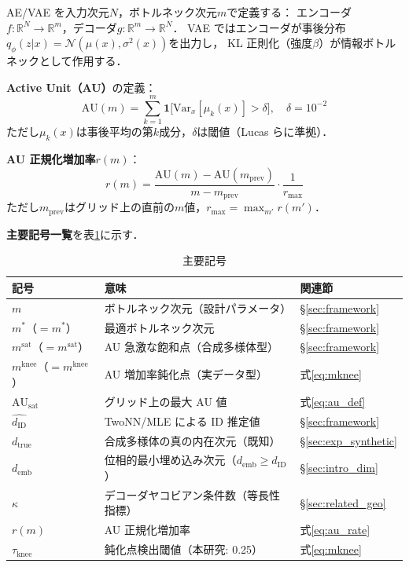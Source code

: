 \documentclass[11pt,a4paper]{jsarticle}
\newcommand{\dID}{d_{\mathrm{ID}}}
\newcommand{\dzopt}{m^*}
\newcommand{\dtrue}{d_{\mathrm{true}}}
\newcommand{\R}{\mathbb{R}}
\newcommand{\kap}{\kappa}
\newcommand{\AUsat}{\mathrm{AU}_{\mathrm{sat}}}
\newcommand{\dzsat}{m^{\mathrm{sat}}}
\newcommand{\mknee}{m^{\mathrm{knee}}}
\newcommand{\demb}{d_{\mathrm{emb}}}
\begin{document}
AE/VAE を入力次元$N$，ボトルネック次元$m$で定義する：
エンコーダ$f: \R^N \to \R^m$，デコーダ$g: \R^m \to \R^N$．
VAE ではエンコーダが事後分布$q_\phi(z|x) = \mathcal{N}(\mu(x), \sigma^2(x))$を出力し，
KL 正則化（強度$\beta$）が情報ボトルネックとして作用する．

\textbf{Active Unit（AU）}の定義：
\begin{equation}
  \mathrm{AU}(m) = \sum_{k=1}^{m} \mathbf{1}\bigl[\mathrm{Var}_x[\mu_k(x)] > \delta\bigr],
  \quad \delta = 10^{-2}
  \label{eq:au_def}
\end{equation}
ただし$\mu_k(x)$は事後平均の第$k$成分，$\delta$は閾値（Lucas ら\cite{lucas2019elbo}に準拠）．

\textbf{AU 正規化増加率}$r(m)$：
\begin{equation}
  r(m) = \frac{\mathrm{AU}(m) - \mathrm{AU}(m_{\mathrm{prev}})}{m - m_{\mathrm{prev}}} \cdot \frac{1}{r_{\max}}
  \label{eq:au_rate}
\end{equation}
ただし$m_{\mathrm{prev}}$はグリッド上の直前の$m$値，$r_{\max} = \max_{m'} r(m')$．

\textbf{主要記号一覧}を表\ref{tab:notation}に示す．

\begin{table}[H]
\centering
\caption{主要記号}
\label{tab:notation}
\small
\begin{tabular}{lll}
\toprule
記号 & 意味 & 関連節 \\
\midrule
$m$ & ボトルネック次元（設計パラメータ） & §\ref{sec:framework} \\
$\dzopt$（$= m^*$） & 最適ボトルネック次元 & §\ref{sec:framework} \\
$\dzsat$（$= m^{\mathrm{sat}}$） & AU 急激な飽和点（合成多様体型） & §\ref{sec:framework} \\
$\mknee$（$= m^{\mathrm{knee}}$） & AU 増加率鈍化点（実データ型） & 式\eqref{eq:mknee} \\
$\AUsat$ & グリッド上の最大 AU 値 & 式\eqref{eq:au_def} \\
$\hat{\dID}$ & TwoNN/MLE による ID 推定値 & §\ref{sec:framework} \\
$\dtrue$ & 合成多様体の真の内在次元（既知） & §\ref{sec:exp_synthetic} \\
$\demb$ & 位相的最小埋め込み次元（$\demb \geq \dID$） & §\ref{sec:intro_dim} \\
$\kap$ & デコーダヤコビアン条件数（等長性指標） & §\ref{sec:related_geo} \\
$r(m)$ & AU 正規化増加率 & 式\eqref{eq:au_rate} \\
$\tau_{\mathrm{knee}}$ & 鈍化点検出閾値（本研究: 0.25） & 式\eqref{eq:mknee} \\
\bottomrule
\end{tabular}
\end{table}
\end{document}
